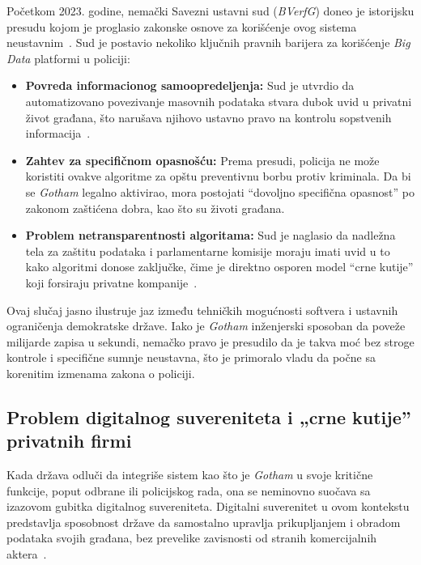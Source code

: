 ﻿\documentclass[12pt]{article}
\begin{document}
Početkom 2023. godine, nemački Savezni ustavni sud (\textit{BVerfG}) doneo je istorijsku presudu kojom je proglasio zakonske osnove za korišćenje ovog sistema neustavnim~\cite{bverfg2023ruling}.
Sud je postavio nekoliko ključnih pravnih barijera za korišćenje \textit{Big Data} platformi u policiji:

\begin{itemize}
    \item \textbf{Povreda informacionog samoopredeljenja:} Sud je utvrdio da automatizovano povezivanje masovnih podataka stvara dubok uvid u privatni život građana, što narušava njihovo ustavno pravo na kontrolu sopstvenih informacija~\cite{architecture2024}.
    \item \textbf{Zahtev za specifičnom opasnošću:} Prema presudi, policija ne može koristiti ovakve algoritme za opštu preventivnu borbu protiv kriminala.
    Da bi se \textit{Gotham} legalno aktivirao, mora postojati \enquote{dovoljno specifična opasnost} po zakonom zaštićena dobra, kao što su životi građana.
    \item \textbf{Problem netransparentnosti algoritama:} Sud je naglasio da nadležna tela za zaštitu podataka i parlamentarne komisije moraju imati uvid u to kako algoritmi donose zaključke, čime je direktno osporen model \enquote{crne kutije} koji forsiraju privatne kompanije~\cite{ulbricht2024palantir}.
\end{itemize}

Ovaj slučaj jasno ilustruje jaz između tehničkih mogućnosti softvera i ustavnih ograničenja demokratske države.
Iako je \textit{Gotham} inženjerski sposoban da poveže milijarde zapisa u sekundi, nemačko pravo je presudilo da je takva moć bez stroge kontrole i specifične sumnje neustavna, što je primoralo vladu da počne sa korenitim izmenama zakona o policiji.

\subsection{Problem digitalnog suvereniteta i „crne kutije” privatnih firmi}

Kada država odluči da integriše sistem kao što je \textit{Gotham} u svoje kritične funkcije, poput odbrane ili policijskog rada, ona se neminovno suočava sa izazovom gubitka digitalnog suvereniteta.
Digitalni suverenitet u ovom kontekstu predstavlja sposobnost države da samostalno upravlja prikupljanjem i obradom podataka svojih građana, bez prevelike zavisnosti od stranih komercijalnih aktera~\cite{carnegie2024private, ulbricht2024palantir}.
\end{document}
